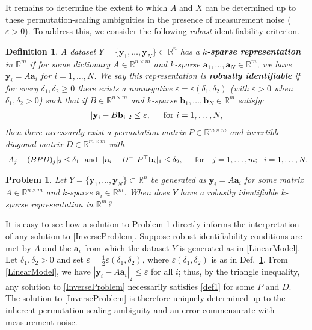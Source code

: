\documentclass[journal, onecolumn]{IEEEtran}
\newtheorem{problem}{Problem}
\newtheorem{definition}{Definition}
\begin{document}
It remains to determine the extent to which $A$ and $X$ can be determined up to these permutation-scaling ambiguities in the presence of measurement noise ($\varepsilon > 0$). To address this, we consider the following \emph{robust} identifiability criterion.

\begin{definition}\label{Uniqueness}
A dataset $Y = \{\mathbf{y}_1, \ldots, \mathbf{y}_N\} \subset \mathbb{R}^n$ has a \textbf{$k$-sparse representation} in $\mathbb{R}^m$ if for some dictionary $A \in \mathbb{R}^{n \times m}$ and $k$-sparse $\mathbf{a}_1, \ldots, \mathbf{a}_N \in \mathbb{R}^m$, we have $\mathbf{y}_i = A\mathbf{a}_i$ for $i = 1, \ldots, N$. We say this representation is \textbf{robustly identifiable} if for every $\delta_1, \delta_2 \geq 0$ there exists a nonnegative $\varepsilon = \varepsilon(\delta_1, \delta_2)$ (with $\varepsilon > 0$ when  $\delta_1, \delta_2 > 0$) such that if $B \in \mathbb{R}^{n \times m}$ and $k$-sparse $\mathbf{b}_1, \ldots, \mathbf{b}_N \in \mathbb{R}^m$ satisfy:
\begin{align}\label{y-Bb}
|\mathbf{y}_i - B\mathbf{b}_i|_2 \leq \varepsilon,\indent \text{for } i = 1, \ldots, N,
\end{align}
%
then there necessarily exist a permutation matrix $P \in \mathbb{R}^{m \times m}$ and invertible diagonal matrix $D \in \mathbb{R}^{m \times m}$ with
\begin{align}\label{def1}
|A_j - (BPD)_j|_2 \leq \delta_1 \ \ \text{and} \ \ |\mathbf{a}_i - D^{-1}P^{\top}\mathbf{b}_i|_1 \leq \delta_2,\indent \text{for } \ \ j = 1, \ldots, m; \ \ i = 1, \ldots, N.
\end{align}
\end{definition}

\begin{problem}\label{DUTproblem}
Let $Y = \{\mathbf{y}_1, \ldots, \mathbf{y}_N \} \subset \mathbb{R}^n$ be generated as $\mathbf{y}_i = A\mathbf{a}_i$ for some matrix $A \in \mathbb{R}^{n \times m}$ and $k$-sparse $\mathbf{a}_i \in \mathbb{R}^m$. When does $Y$ have a robustly identifiable $k$-sparse representation in $\mathbb{R}^m$?
\end{problem}

It is easy to see how a solution to Problem \ref{DUTproblem} directly informs the interpretation of any solution to \eqref{InverseProblem}. Suppose robust identifiability conditions are met by $A$ and the $\mathbf{a}_i$ from which the dataset $Y$ is generated as in \eqref{LinearModel}. Let $\delta_1, \delta_2 > 0$ and set $\varepsilon = \frac{1}{2}\varepsilon(\delta_1, \delta_2)$, where $\varepsilon(\delta_1, \delta_2)$ is as in Def.~\ref{Uniqueness}. From \eqref{LinearModel}, we have $|\mathbf{y}_i - A\mathbf{a}_i|_2 \leq \varepsilon$ for all $i$; thus, by the triangle inequality, any solution to \eqref{InverseProblem} necessarily satisfies \eqref{def1} for some $P$ and $D$. The solution to \eqref{InverseProblem} is therefore uniquely determined up to the inherent permutation-scaling ambiguity and an error commensurate with measurement noise.
\end{document}
